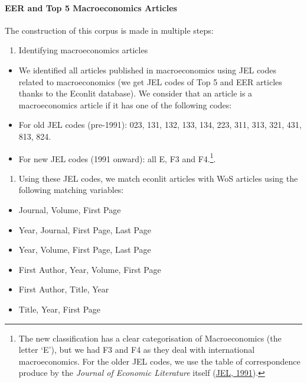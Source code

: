 \documentclass[
  12pt,
  onecolumn]{article}
\providecommand{\tightlist}{%
  \setlength{\itemsep}{0pt}\setlength{\parskip}{0pt}}
\begin{document}
\hypertarget{eer-top5-macro}{%
\paragraph*{EER and Top 5 Macroeconomics
Articles}\label{eer-top5-macro}}

The construction of this corpus is made in multiple steps:

\begin{enumerate}
\def\labelenumi{\arabic{enumi}.}
\tightlist
\item
  Identifying macroeconomics articles
\end{enumerate}

\begin{itemize}
\item
  We identified all articles published in macroeconomics using JEL codes
  related to macroeconomics (we get JEL codes of Top 5 and EER articles
  thanks to the Econlit database). We consider that an article is a
  macroeconomics article if it has one of the following codes:
\item
  For old JEL codes (pre-1991): 023, 131, 132, 133, 134, 223, 311, 313,
  321, 431, 813, 824.
\item
  For new JEL codes (1991 onward): all E, F3 and F4.\footnote{The new
    classification has a clear categorisation of Macroeconomics (the
    letter `E'), but we had F3 and F4 as they deal with international
    macroeconomics. For the older JEL codes, we use the table of
    correspondence produce by the \emph{Journal of Economic Literature}
    itself (\protect\hyperlink{ref-jel1991}{JEL, 1991}).}.
\end{itemize}

\begin{enumerate}
\def\labelenumi{\arabic{enumi}.}
\setcounter{enumi}{1}
\tightlist
\item
  Using these JEL codes, we match econlit articles with WoS articles
  using the following matching variables:
\end{enumerate}

\begin{itemize}
\tightlist
\item
  Journal, Volume, First Page
\item
  Year, Journal, First Page, Last Page
\item
  Year, Volume, First Page, Last Page
\item
  First Author, Year, Volume, First Page
\item
  First Author, Title, Year
\item
  Title, Year, First Page
\end{itemize}
\end{document}
